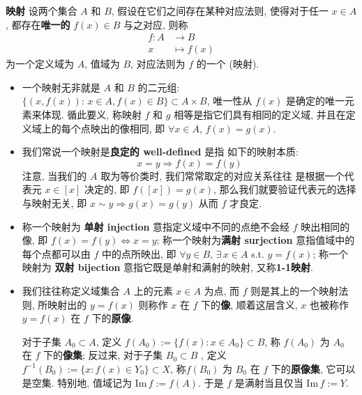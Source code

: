 \documentclass[UTF8]{book}
\begin{document}
\begin{definition}
    \textbf{映射} 
    设两个集合 $A$ 和 $B$, 假设在它们之间存在某种对应法则, 使得对于任一
    $x\in A$, 都存在\textbf{唯一的} $f(x) \in B$ 与之对应, 则称
    $$
    \begin{aligned}
        f: A &\to B \\
        x &\mapsto f(x)
    \end{aligned}
    $$
    为一个定义域为 $A$, 值域为 $B$, 对应法则为 $f$ 的一个 (映射). 

    \begin{itemize}
        \item  一个映射无非就是 $A$ 和 $B$ 的二元组: 
        $ \{(x,f(x)):\,x \in A, f(x)\in B\} \subset A\times B $, 
        唯一性从 $f(x)$ 是确定的唯一元素来体现. 
        循此要义, 称映射 $f$ 和 $g$ 相等是指它们具有相同的定义域, 
        并且在定义域上的每个点映出的像相同, 即 $\forall x \in A, \,
        f(x)=g(x)$. 

        \item 我们常说一个映射是\textbf{良定的 well-defined} 是指
        如下的映射本质: 
        $$ x = y \Longrightarrow f(x) = f(y) $$
        注意, 当我们的 $A$ 取为等价类时, 我们常常取定的对应关系往往
        是根据一个代表元 $x \in [x]$ 决定的, 即 $f([x])= g(x)$, 
        那么我们就要验证代表元的选择与映射无关, 即 
        $x\sim y \Longrightarrow g(x) = g(y)$ 从而 $f$ 才良定. 
        
        \item 称一个映射为
        \textbf{单射 injection }意指定义域中不同的点绝不会经 $f$ 映出相同的像,
        即 $f(x) = f(y) \Longleftrightarrow x =y$; 
        称一个映射为\textbf{满射 surjection }意指值域中的每个点都可以由 
        $f$ 中的点所映出,
        即 $\forall y \in B,\,\exists\,x\in A$ s.t. $y=f(x)$; 
        称一个映射为
        \textbf{双射 bijection }意指它既是单射和满射的映射, 
        又称\textbf{1-1映射}. 
        
        \item 我们往往称定义域集合 $A$ 上的元素 $x \in A$ 为点, 
        而 $f$ 则是其上的一个映射法则, 
        所映射出的 $y=f(x)$ 则称作 $x$ 在 $f$ 下的\textbf{像}, 
        顺着这层含义, $x$ 也被称作 $y=f(x)$ 在 $f$ 下的\textbf{原像}. 
    
        对于子集 $A_0\subset A$, 
        定义 $f(A_0):=\{f(x):x\in A_0\}\subset B$, 
        称 $f(A_0)$ 为 $A_0$ 在 $f$ 下的\textbf{像集}; 
        反过来, 对于子集 $B_0\subset B$ , 定义 
        $f^{-1}(B_0):=\{x:f(x)\in Y_0\}\subset X$,
        称$f(B_0)$ 为 $B_0$ 在 $f$ 下的\textbf{原像集}, 
        它可以是空集. 
        特别地, 值域记为 $\mathrm{Im}\,f := f(A)$. 
        于是 $f$ 是满射当且仅当 $\mathrm{Im}\,f := Y$. 


\end{itemize}
\end{definition}
\end{document}
